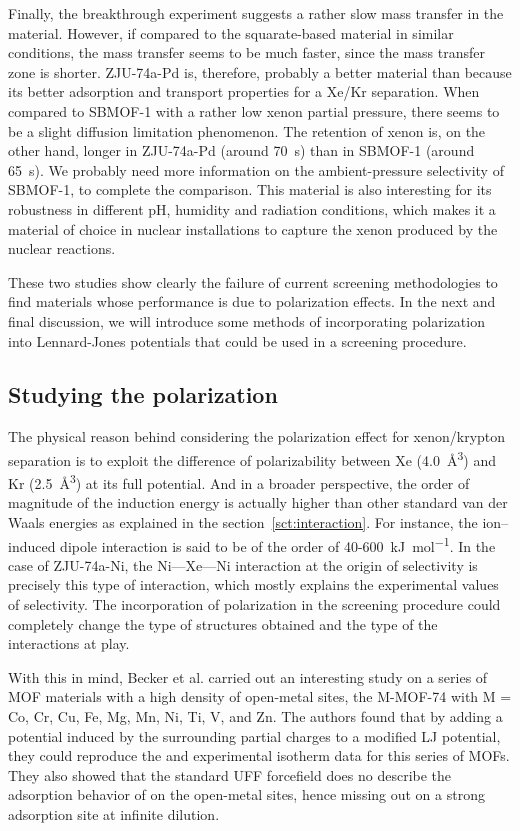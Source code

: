 \documentclass[main]{subfiles}
\begin{document}
Finally, the breakthrough experiment suggests a rather slow mass transfer in the material. However, if compared to the squarate-based material in similar conditions, the mass transfer seems to be much faster, since the mass transfer zone is shorter. ZJU-74a-Pd is, therefore, probably a better material than  because its better adsorption and transport properties for a Xe/Kr separation. When compared to SBMOF-1 with a rather low xenon partial pressure, there seems to be a slight diffusion limitation phenomenon. The retention of xenon is, on the other hand, longer in ZJU-74a-Pd (around \SI{70}{\s}) than in SBMOF-1 (around \SI{65}{\s}). We probably need more information on the ambient-pressure selectivity of SBMOF-1, to complete the comparison.
This material is also interesting for its robustness in different pH, humidity and radiation conditions, which makes it a material of choice in nuclear installations to capture the xenon produced by the nuclear reactions.

These two studies show clearly the failure of current screening methodologies to find materials whose performance is due to polarization effects. In the next and final discussion, we will introduce some methods of incorporating polarization into Lennard-Jones potentials that could be used in a screening procedure.

\subsection{Studying the polarization}

The physical reason behind considering the polarization effect for xenon/krypton separation is to exploit the difference of polarizability between Xe (\SI{4.0}{\cubic\angstrom}) and Kr (\SI{2.5}{\cubic\angstrom})\autocite{Olney1997} at its full potential. And in a broader perspective, the order of magnitude of the induction energy is actually higher than other standard van der Waals energies as explained in the section~\ref{sct:interaction}. For instance, the ion--induced dipole interaction is said to be of the order of 40-600~\si{\kJ\per\mol}. In the case of ZJU-74a-Ni, the Ni---Xe---Ni interaction at the origin of selectivity is precisely this type of interaction, which mostly explains the experimental values of selectivity. The incorporation of polarization in the screening procedure could completely change the type of structures obtained and the type of the interactions at play.

With this in mind, Becker et al. carried out an interesting study on a series of MOF materials with a high density of open-metal sites, the M-MOF-74 with M = Co, Cr, Cu, Fe, Mg, Mn, Ni, Ti, V, and Zn.\autocite{Becker_2017} The authors found that by adding a potential induced by the surrounding partial charges to a modified LJ potential, they could reproduce the  and  experimental isotherm data for this series of MOFs. They also showed that the standard UFF forcefield does no describe the adsorption behavior of  on the open-metal sites, hence missing out on a strong adsorption site at infinite dilution. 
\end{document}
